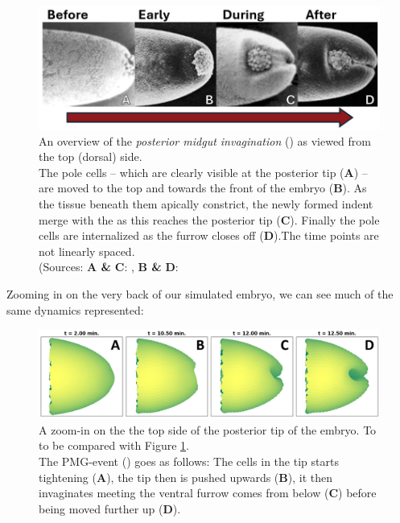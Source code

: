 \begin{figure}[H]
    \centering
    \includegraphics[width=1.\linewidth]{chapters/Results/figures/4stepPMG_annotated.png}
    \caption{An overview of the \textit{posterior midgut invagination} () as viewed from the top (dorsal) side. \\The pole cells -- which are clearly visible at the posterior tip (\textbf{A}) -- are moved to the top and towards the front of the embryo (\textbf{B}). As the tissue beneath them apically constrict, the newly formed indent merge with the  as this reaches the posterior tip (\textbf{C}). Finally the pole cells are internalized as the furrow closes off (\textbf{D}).The time points are not linearly spaced.\\
    (Sources: \textbf{A \&} \textbf{C}: , \textbf{B \&} \textbf{D}: }
    \label{fig:PMG-IRL}
\end{figure}
Zooming in on the very back of our simulated embryo, we can see much of the same dynamics represented:
\begin{figure}[H]
    \centering
    \includegraphics[width=1.\linewidth]{chapters/Results/figures/VisualPMG.png}
    \caption{A zoom-in on the the top side of the posterior tip of the embryo. To to be compared with Figure \ref{fig:PMG-IRL}. \\The PMG-event () goes as follows: The cells in the tip starts tightening (\textbf{A}), the tip then is pushed upwards (\textbf{B}), it then invaginates meeting the ventral furrow comes from below (\textbf{C}) before being moved further up (\textbf{D}).}
    \label{fig:visual-pmg-external}
\end{figure}

